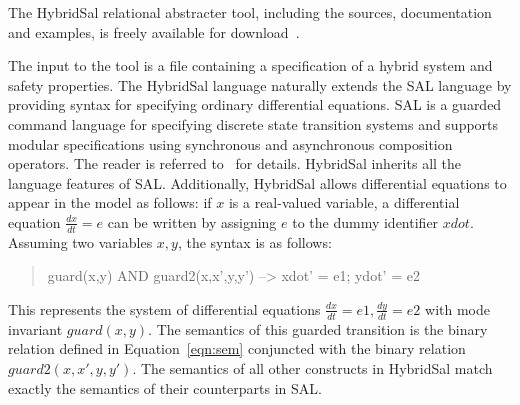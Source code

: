 \documentclass{llncs}
\begin{document}
The HybridSal relational abstracter tool, including
the sources, documentation and examples, is freely available
for download~\cite{hsalrelabs}.

The input to the tool is a file containing a 
specification of a hybrid system and safety
properties.  The HybridSal language naturally
extends the SAL language by providing syntax for
specifying ordinary differential equations.
SAL is a guarded command language for specifying
discrete state transition systems and supports
modular specifications using synchronous and
asynchronous composition operators.  The reader
is referred to~\cite{SAL-language} for details.
HybridSal inherits all the language features of
SAL.  Additionally, HybridSal allows 
differential equations to appear in the model as follows:
if $x$ is a real-valued variable, a differential equation
$\frac{dx}{dt}=e$ can be written by assigning $e$ to the
dummy identifier $xdot$.
Assuming two variables $x,y$, the syntax is as follows:
\begin{quote}
\begin{tt}
 guard(x,y) AND guard2(x,x',y,y') --> xdot' = e1; ydot' = e2
\end{tt}
\end{quote}
This represents the system of differential equations
$\frac{dx}{dt} = e1, \frac{dy}{dt} = e2$ with
mode invariant $\mathit{guard}(x,y)$.
The semantics of this guarded transition is the binary
relation defined in Equation~\ref{eqn:sem} conjuncted with
the binary relation $\mathit{guard2}(x,x',y,y')$.
The semantics of all other constructs in HybridSal match
exactly the semantics of their counterparts in SAL.
\end{document}
